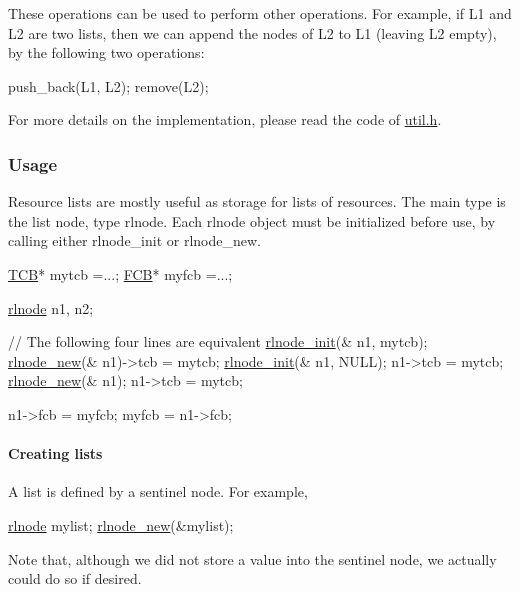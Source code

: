 These operations can be used to perform other operations. For example, if L1 and L2 are two lists, then we can append the nodes of L2 to L1 (leaving L2 empty), by the following two operations\+: \begin{DoxyVerb}push_back(L1, L2);
remove(L2);
\end{DoxyVerb}


For more details on the implementation, please read the code of \hyperlink{util_8h}{util.\+h}.

\subsubsection*{Usage }

Resource lists are mostly useful as storage for lists of resources. The main type is the list node, type {\ttfamily rlnode}. Each {\ttfamily rlnode} object must be initialized before use, by calling either {\ttfamily rlnode\+\_\+init} or {\ttfamily rlnode\+\_\+new}. 
\begin{DoxyCode}
\hyperlink{structthread__control__block}{TCB}* mytcb =...;
\hyperlink{structfile__control__block}{FCB}* myfcb =...;

\hyperlink{structresource__list__node}{rlnode} n1, n2;

\textcolor{comment}{// The following four lines are equivalent }
\hyperlink{group__rlists_ga578e6dc256d4f1580bd8500edf374aca}{rlnode\_init}(& n1, mytcb); 
\hyperlink{group__rlists_gaccdb4bce65952fede472de20297eb36e}{rlnode\_new}(& n1)->tcb = mytcb;
\hyperlink{group__rlists_ga578e6dc256d4f1580bd8500edf374aca}{rlnode\_init}(& n1, NULL);  n1->tcb = mytcb;
\hyperlink{group__rlists_gaccdb4bce65952fede472de20297eb36e}{rlnode\_new}(& n1);  n1->tcb = mytcb;


n1->fcb = myfcb;
myfcb = n1->fcb;
\end{DoxyCode}


\paragraph*{Creating lists}

A list is defined by a sentinel node. For example, 
\begin{DoxyCode}
\hyperlink{structresource__list__node}{rlnode} mylist;  
\hyperlink{group__rlists_gaccdb4bce65952fede472de20297eb36e}{rlnode\_new}(&mylist);
\end{DoxyCode}
 Note that, although we did not store a value into the sentinel node, we actually could do so if desired.

